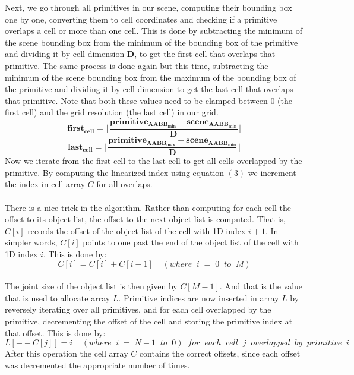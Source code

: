 \documentclass[11pt,a4paper]{article}
\begin{document}
Next, we go through all primitives in our scene, computing their bounding box one by one, converting them to cell coordinates and checking if a primitive overlaps a cell or more than one cell. This is done by subtracting the minimum of the scene bounding box from the minimum of the bounding box of the primitive and dividing it by cell dimension $\boldsymbol{D}$, to get the first cell that overlaps that primitive. The same process is done again but this time, subtracting the minimum of the scene bounding box from the maximum of the bounding box of the primitive and dividing it by cell dimension to get the last cell that overlaps that primitive. Note that both these values need to be clamped between $0$ (the first cell) and the grid resolution (the last cell) in our grid.
\begin{equation}
	\boldsymbol{first_{cell}} = \lfloor \frac{\boldsymbol{primitive_{AABB_{min}}} - \boldsymbol{scene_{AABB_{min}}}}{\boldsymbol{D}} \rfloor
\end{equation} 
\begin{equation}
	\boldsymbol{last_{cell}} = \lfloor \frac{\boldsymbol{primitive_{AABB_{max}}} - \boldsymbol{scene_{AABB_{min}}}}{\boldsymbol{D}} \rfloor
\end{equation} 
\noindent
Now we iterate from the first cell to the last cell to get all cells overlapped by the primitive. By computing the linearized index using equation $(3)$ we increment the index in cell array $C$ for all overlaps.
\\
\noindent
\\
There is a nice trick in the algorithm. Rather than computing for each cell the offset to its object list, the offset to the next object list is computed. That is, $C[i]$ records the offset of the object list of the cell with 1D index $i+1$. In simpler words, $C[i]$ points to one past the end of the object list of the cell with 1D index $i$. This is done by:
\begin{equation}
C[i] = C[i] + C[i-1]\;\;\;\;(where\;\;i\;=\;0\;\;to\;\;M)
\end{equation}
\\
\noindent
The joint size of the object list is then given by $C[M - 1]$. And that is the value that is used to allocate array $L$. Primitive indices are now inserted in array $L$ by reversely iterating over all primitives, and for each cell overlapped by the primitive, decrementing the offset of the cell and storing the primitive index at that offset. This is done by:
\begin{equation}
L[--C[j]] = i\;\;\;\;(where\;\;i\;=\;N-1\;\;to\;\;0)\;\;for\;\;each\;\;cell\;\;j\;\;overlapped\;\;by\;\;primitive\;\;i
\end{equation}
After this operation the cell array $C$ contains the correct offsets, since each offset was decremented the appropriate number of times.
\end{document}
